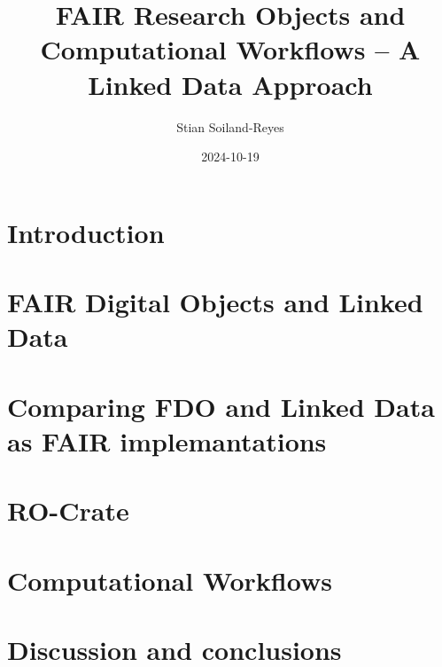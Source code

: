 \documentclass[british,a4paper]{book}
\title{FAIR Research Objects and Computational Workflows – A Linked Data Approach}
\author{Stian Soiland-Reyes}
\date{2024-10-19}
\begin{document}
\frontmatter
\maketitle



\printglossaries



\mainmatter
\fancyhead[LO]{\leftmark}

\chapter{Introduction}
\label{chapter:introduction}






\chapter{FAIR Digital Objects and Linked Data}
\label{chapter:background}


\chapter{Comparing FDO and Linked Data as FAIR implemantations}
\label{chapter:fdo}




\chapter{RO-Crate}
\label{chapter:ro-crate}





\chapter{Computational Workflows}
\label{chapter:workflows}







\chapter{Discussion and conclusions}
\label{chapter:conclusions}



\appendix
{}
\end{document}
